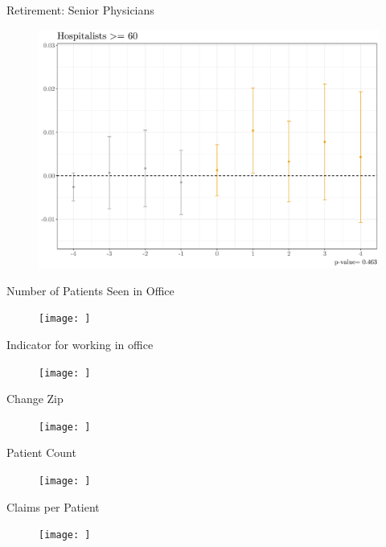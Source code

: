 \documentclass[10pt]{beamer}
\begin{document}
\begin{frame}{Retirement: Senior Physicians}
\begin{figure}[ht]
    \centering
    \includegraphics[scale=.4]{Objects/Presentation_retire_old.pdf}
\end{figure}
\end{frame}

\begin{frame}{Number of Patients Seen in Office}
\begin{figure}[ht]
    \centering
    \texttt{[image: ]}
\end{figure}
\end{frame}

\begin{frame}{Indicator for working in office}
\begin{figure}[ht]
    \centering
    \texttt{[image: ]}
\end{figure}
\end{frame}

\begin{frame}{Change Zip}
\begin{figure}[ht]
    \centering
    \texttt{[image: ]}
\end{figure}
\end{frame}

\begin{frame}{Patient Count}
\begin{figure}[ht]
    \centering
    \texttt{[image: ]}
\end{figure}
\end{frame}

\begin{frame}{Claims per Patient}
\begin{figure}[ht]
    \centering
    \texttt{[image: ]}
\end{figure}
\end{frame}
\end{document}
